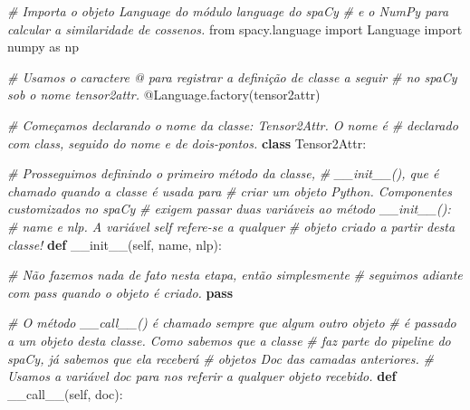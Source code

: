 \documentclass[
  brazilian,
]{article}
\newenvironment{Shaded}{}{}
\newcommand{\AttributeTok}[1]{\textcolor[rgb]{0.49,0.56,0.16}{#1}}
\newcommand{\CommentTok}[1]{\textcolor[rgb]{0.38,0.63,0.69}{\textit{#1}}}
\newcommand{\ControlFlowTok}[1]{\textcolor[rgb]{0.00,0.44,0.13}{\textbf{#1}}}
\newcommand{\FunctionTok}[1]{\textcolor[rgb]{0.02,0.16,0.49}{#1}}
\newcommand{\ImportTok}[1]{#1}
\newcommand{\KeywordTok}[1]{\textcolor[rgb]{0.00,0.44,0.13}{\textbf{#1}}}
\newcommand{\NormalTok}[1]{#1}
\newcommand{\StringTok}[1]{\textcolor[rgb]{0.25,0.44,0.63}{#1}}
\newcommand{\VariableTok}[1]{\textcolor[rgb]{0.10,0.09,0.49}{#1}}
\begin{document}
\begin{Shaded}
\begin{Highlighting}[]
\CommentTok{\# Importa o objeto Language do módulo \textquotesingle{}language\textquotesingle{} do spaCy}
\CommentTok{\# e o NumPy para calcular a similaridade de cossenos.}
\ImportTok{from}\NormalTok{ spacy.language }\ImportTok{import}\NormalTok{ Language}
\ImportTok{import}\NormalTok{ numpy }\ImportTok{as}\NormalTok{ np}

\CommentTok{\# Usamos o caractere @ para registrar a definição de classe a seguir}
\CommentTok{\# no spaCy sob o nome \textquotesingle{}tensor2attr\textquotesingle{}.}
\AttributeTok{@Language.factory}\NormalTok{(}\StringTok{\textquotesingle{}tensor2attr\textquotesingle{}}\NormalTok{)}

\CommentTok{\# Começamos declarando o nome da classe: Tensor2Attr. O nome é}
\CommentTok{\# declarado com \textquotesingle{}class\textquotesingle{}, seguido do nome e de dois{-}pontos.}
\KeywordTok{class}\NormalTok{ Tensor2Attr:}
    
    \CommentTok{\# Prosseguimos definindo o primeiro método da classe,}
    \CommentTok{\# \_\_init\_\_(), que é chamado quando a classe é usada para}
    \CommentTok{\# criar um objeto Python. Componentes customizados no spaCy}
    \CommentTok{\# exigem passar duas variáveis ao método \_\_init\_\_():}
    \CommentTok{\# \textquotesingle{}name\textquotesingle{} e \textquotesingle{}nlp\textquotesingle{}. A variável \textquotesingle{}self\textquotesingle{} refere{-}se a qualquer}
    \CommentTok{\# objeto criado a partir desta classe!}
    \KeywordTok{def} \FunctionTok{\_\_init\_\_}\NormalTok{(}\VariableTok{self}\NormalTok{, name, nlp):}
        
        \CommentTok{\# Não fazemos nada de fato nesta etapa, então simplesmente}
        \CommentTok{\# seguimos adiante com \textquotesingle{}pass\textquotesingle{} quando o objeto é criado.}
        \ControlFlowTok{pass}

    \CommentTok{\# O método \_\_call\_\_() é chamado sempre que algum outro objeto}
    \CommentTok{\# é passado a um objeto desta classe. Como sabemos que a classe}
    \CommentTok{\# faz parte do pipeline do spaCy, já sabemos que ela receberá}
    \CommentTok{\# objetos Doc das camadas anteriores.}
    \CommentTok{\# Usamos a variável \textquotesingle{}doc\textquotesingle{} para nos referir a qualquer objeto recebido.}
    \KeywordTok{def} \FunctionTok{\_\_call\_\_}\NormalTok{(}\VariableTok{self}\NormalTok{, doc):}
        

\end{Highlighting}
\end{Shaded}
\end{document}
